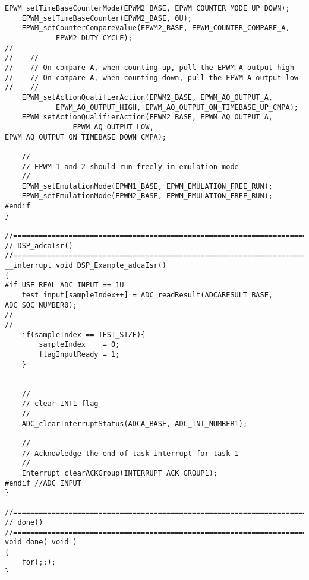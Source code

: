 \begin{lstlisting}[caption=\raggedright{mcu-libs/RLS.h}, frame=single]
    EPWM_setTimeBaseCounterMode(EPWM2_BASE, EPWM_COUNTER_MODE_UP_DOWN);
    EPWM_setTimeBaseCounter(EPWM2_BASE, 0U);
    EPWM_setCounterCompareValue(EPWM2_BASE, EPWM_COUNTER_COMPARE_A,
            EPWM2_DUTY_CYCLE);
//
//    //
//    // On compare A, when counting up, pull the EPWM A output high
//    // On compare A, when counting down, pull the EPWM A output low
//    //
    EPWM_setActionQualifierAction(EPWM2_BASE, EPWM_AQ_OUTPUT_A,
            EPWM_AQ_OUTPUT_HIGH, EPWM_AQ_OUTPUT_ON_TIMEBASE_UP_CMPA);
    EPWM_setActionQualifierAction(EPWM2_BASE, EPWM_AQ_OUTPUT_A,
                EPWM_AQ_OUTPUT_LOW, EPWM_AQ_OUTPUT_ON_TIMEBASE_DOWN_CMPA);

    //
    // EPWM 1 and 2 should run freely in emulation mode
    //
    EPWM_setEmulationMode(EPWM1_BASE, EPWM_EMULATION_FREE_RUN);
    EPWM_setEmulationMode(EPWM2_BASE, EPWM_EMULATION_FREE_RUN);
#endif
}

//=============================================================================
// DSP_adcaIsr()
//=============================================================================
__interrupt void DSP_Example_adcaIsr()
{
#if USE_REAL_ADC_INPUT == 1U
	test_input[sampleIndex++] = ADC_readResult(ADCARESULT_BASE, ADC_SOC_NUMBER0);
//
//
    if(sampleIndex == TEST_SIZE){
        sampleIndex    = 0;
        flagInputReady = 1;
    }


    //
    // clear INT1 flag
    //
    ADC_clearInterruptStatus(ADCA_BASE, ADC_INT_NUMBER1);

    //
    // Acknowledge the end-of-task interrupt for task 1
    //
    Interrupt_clearACKGroup(INTERRUPT_ACK_GROUP1);
#endif //ADC_INPUT
}

//=============================================================================
// done()
//=============================================================================
void done( void )
{
    for(;;);
}

\end{lstlisting}
